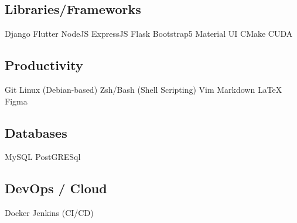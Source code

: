 \documentclass[]{openfont}
\begin{document}
\begin{minipage}[t]{0.33\textwidth}
    \subsection{Libraries/Frameworks}
    Django \textbullet{} Flutter \textbullet{} NodeJS \textbullet{} ExpressJS \textbullet{} Flask \textbullet{} Bootstrap5 \textbullet{} Material UI \textbullet{} CMake \textbullet{} CUDA
    \sectionsep

    \subsection{Productivity}
    Git \textbullet{} Linux (Debian-based) \textbullet{} Zsh/Bash (Shell Scripting) \textbullet{} Vim \textbullet{} Markdown \textbullet{} LaTeX \textbullet{} Figma
    \sectionsep

    \subsection{Databases}
    MySQL \textbullet{} PostGRESql
    \sectionsep

    \subsection{DevOps / Cloud}
    Docker \textbullet{} Jenkins (CI/CD)
    \sectionsep


\end{minipage}
\hfill
\end{document}
